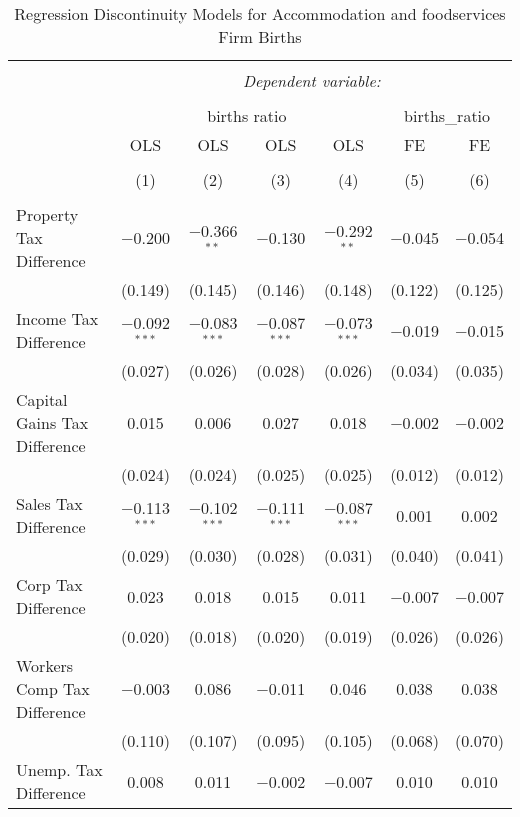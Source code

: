 
\begin{table}[!htbp] \centering 
  \caption{Regression Discontinuity Models for  Accommodation and foodservices Firm Births} 
  \label{72rd} 
\begin{tabular}{@{\extracolsep{5pt}}lcccccc} 
\\[-1.8ex]\hline 
\hline \\[-1.8ex] 
 & \multicolumn{6}{c}{\textit{Dependent variable:}} \\ 
\cline{2-7} 
\\[-1.8ex] & \multicolumn{4}{c}{births ratio} & \multicolumn{2}{c}{births\_ratio} \\ 
 & OLS & OLS & OLS & OLS & FE & FE \\ 
\\[-1.8ex] & (1) & (2) & (3) & (4) & (5) & (6)\\ 
\hline \\[-1.8ex] 
 Property Tax Difference & $-$0.200 & $-$0.366$^{**}$ & $-$0.130 & $-$0.292$^{**}$ & $-$0.045 & $-$0.054 \\ 
  & (0.149) & (0.145) & (0.146) & (0.148) & (0.122) & (0.125) \\ 
  Income Tax Difference & $-$0.092$^{***}$ & $-$0.083$^{***}$ & $-$0.087$^{***}$ & $-$0.073$^{***}$ & $-$0.019 & $-$0.015 \\ 
  & (0.027) & (0.026) & (0.028) & (0.026) & (0.034) & (0.035) \\ 
  Capital Gains Tax Difference & 0.015 & 0.006 & 0.027 & 0.018 & $-$0.002 & $-$0.002 \\ 
  & (0.024) & (0.024) & (0.025) & (0.025) & (0.012) & (0.012) \\ 
  Sales Tax Difference & $-$0.113$^{***}$ & $-$0.102$^{***}$ & $-$0.111$^{***}$ & $-$0.087$^{***}$ & 0.001 & 0.002 \\ 
  & (0.029) & (0.030) & (0.028) & (0.031) & (0.040) & (0.041) \\ 
  Corp Tax Difference & 0.023 & 0.018 & 0.015 & 0.011 & $-$0.007 & $-$0.007 \\ 
  & (0.020) & (0.018) & (0.020) & (0.019) & (0.026) & (0.026) \\ 
  Workers Comp Tax Difference & $-$0.003 & 0.086 & $-$0.011 & 0.046 & 0.038 & 0.038 \\ 
  & (0.110) & (0.107) & (0.095) & (0.105) & (0.068) & (0.070) \\ 
  Unemp. Tax Difference & 0.008 & 0.011 & $-$0.002 & $-$0.007 & 0.010 & 0.010 \\ 

\end{tabular}
\end{table}
